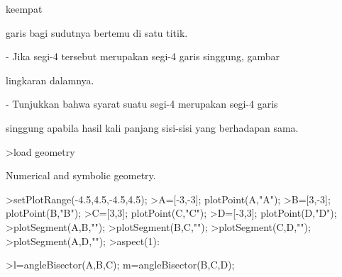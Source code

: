 \documentclass[a4paper,10pt]{article}
\begin{document}
\begin{eulernotebook}
\begin{eulercomment}
\begin{eulercomment}
\begin{eulercomment}
\begin{eulercomment}
\begin{eulercomment}
\begin{eulercomment}
\begin{eulercomment}
\begin{eulercomment}
\begin{eulercomment}
\begin{eulercomment}
\begin{eulercomment}
\begin{eulercomment}
\begin{eulercomment}
\begin{eulercomment}
\begin{eulercomment}
\begin{eulercomment}
\begin{eulercomment}
\begin{eulercomment}
\begin{eulercomment}
\begin{eulercomment}
\begin{eulercomment}
\begin{eulercomment}
\begin{eulercomment}
\begin{eulercomment}
\begin{eulercomment}
\begin{eulercomment}
\begin{eulercomment}
\begin{eulercomment}
\begin{eulercomment}
\begin{eulercomment}
\begin{eulercomment}
\begin{eulercomment}
\begin{eulercomment}
\begin{eulercomment}
\begin{eulercomment}
\begin{eulercomment}
\begin{eulercomment}
\begin{eulercomment}
\begin{eulercomment}
\begin{eulercomment}
\begin{eulercomment}
\begin{eulercomment}
\begin{eulercomment}
\begin{eulercomment}
\begin{eulercomment}
\begin{eulercomment}
\begin{eulercomment}
\begin{eulercomment}
\begin{eulercomment}
\begin{eulercomment}
\begin{eulercomment}
\begin{eulercomment}
\begin{eulercomment}
\begin{eulercomment}
\begin{eulercomment}
\begin{eulercomment}
\begin{eulercomment}
\begin{eulercomment}
\begin{eulercomment}
\begin{eulercomment}
\begin{eulercomment}
\begin{eulercomment}
\begin{eulercomment}
\begin{eulercomment}
\begin{eulerttcomment}
keempat
\end{eulerttcomment}
\begin{eulercomment}
garis bagi sudutnya bertemu di satu titik.\\
\end{eulercomment}
\begin{eulerttcomment}
   - Jika segi-4 tersebut merupakan segi-4 garis singgung, gambar
\end{eulerttcomment}
\begin{eulercomment}
lingkaran dalamnya.\\
\end{eulercomment}
\begin{eulerttcomment}
   - Tunjukkan bahwa syarat suatu segi-4 merupakan segi-4 garis
\end{eulerttcomment}
\begin{eulercomment}
singgung apabila hasil kali panjang sisi-sisi yang berhadapan sama.
\end{eulercomment}
\begin{eulerprompt}
>load geometry
\end{eulerprompt}
\begin{euleroutput}
  Numerical and symbolic geometry.
\end{euleroutput}
\begin{eulerprompt}
>setPlotRange(-4.5,4.5,-4.5,4.5);
>A=[-3,-3]; plotPoint(A,"A");
>B=[3,-3]; plotPoint(B,"B");
>C=[3,3]; plotPoint(C,"C");
>D=[-3,3]; plotPoint(D,"D");
>plotSegment(A,B,"");
>plotSegment(B,C,"");
>plotSegment(C,D,"");
>plotSegment(A,D,"");
>aspect(1):
\end{eulerprompt}
\begin{eulerprompt}
>l=angleBisector(A,B,C); m=angleBisector(B,C,D); 
\end{eulerprompt}
\end{eulercomment}
\end{eulercomment}
\end{eulercomment}
\end{eulercomment}
\end{eulercomment}
\end{eulercomment}
\end{eulercomment}
\end{eulercomment}
\end{eulercomment}
\end{eulercomment}
\end{eulercomment}
\end{eulercomment}
\end{eulercomment}
\end{eulercomment}
\end{eulercomment}
\end{eulercomment}
\end{eulercomment}
\end{eulercomment}
\end{eulercomment}
\end{eulercomment}
\end{eulercomment}
\end{eulercomment}
\end{eulercomment}
\end{eulercomment}
\end{eulercomment}
\end{eulercomment}
\end{eulercomment}
\end{eulercomment}
\end{eulercomment}
\end{eulercomment}
\end{eulercomment}
\end{eulercomment}
\end{eulercomment}
\end{eulercomment}
\end{eulercomment}
\end{eulercomment}
\end{eulercomment}
\end{eulercomment}
\end{eulercomment}
\end{eulercomment}
\end{eulercomment}
\end{eulercomment}
\end{eulercomment}
\end{eulercomment}
\end{eulercomment}
\end{eulercomment}
\end{eulercomment}
\end{eulercomment}
\end{eulercomment}
\end{eulercomment}
\end{eulercomment}
\end{eulercomment}
\end{eulercomment}
\end{eulercomment}
\end{eulercomment}
\end{eulercomment}
\end{eulercomment}
\end{eulercomment}
\end{eulercomment}
\end{eulercomment}
\end{eulercomment}
\end{eulercomment}
\end{eulercomment}
\end{eulercomment}
\end{eulernotebook}
\end{document}
